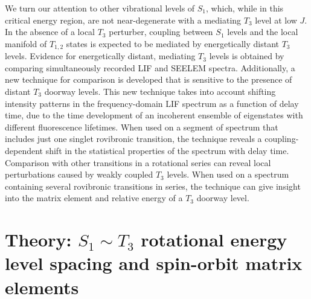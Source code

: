 \documentclass[12pt]{mitthesis}
\begin{document}
We turn our attention to other vibrational levels of $S_1$, which,
while in this critical energy region, are not near-degenerate with a
mediating $T_3$ level at low $J$.  In the absence of a local $T_3$
perturber, coupling between $S_1$ levels and the local manifold of
$T_{1,2}$ states is expected to be mediated by energetically distant
$T_3$ levels.  Evidence for energetically distant, mediating $T_3$
levels is obtained by comparing simultaneously recorded LIF and SEELEM
spectra.  Additionally, a new technique for comparison is developed
that is sensitive to the presence of distant $T_3$ doorway levels.
This new technique takes into account shifting intensity patterns in
the frequency-domain LIF spectrum as a function of delay time, due to
the time development of an incoherent ensemble of eigenstates with
different fluorescence lifetimes.  When used on a segment of spectrum
that includes just one singlet rovibronic transition, the technique
reveals a coupling-dependent shift in the statistical properties of
the spectrum with delay time.  Comparison with other transitions in a
rotational series can reveal local perturbations caused by weakly
coupled $T_3$ levels.  When used on a spectrum containing several
rovibronic transitions in series, the technique can give insight into
the matrix element and relative energy of a $T_3$ doorway level.

\section{Theory: $S_1 \sim T_3$ rotational energy level spacing and
  spin-orbit matrix elements}
\end{document}

